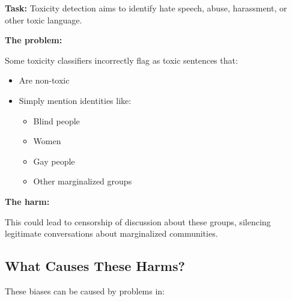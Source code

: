 \documentclass[11pt,a4paper]{article}
\theoremstyle{definition}
\theoremstyle{plain}
\theoremstyle{remark}
\begin{document}
\textbf{Task:} Toxicity detection aims to identify hate speech, abuse, harassment, or other toxic language.

\textbf{The problem:}

Some toxicity classifiers incorrectly flag as toxic sentences that:
\begin{itemize}
    \item Are non-toxic
    \item Simply mention identities like:
    \begin{itemize}
        \item Blind people
        \item Women
        \item Gay people
        \item Other marginalized groups
    \end{itemize}
\end{itemize}

\textbf{The harm:}

This could lead to censorship of discussion about these groups, silencing legitimate conversations about marginalized communities.

\subsection{What Causes These Harms?}

These biases can be caused by problems in:
\end{document}
